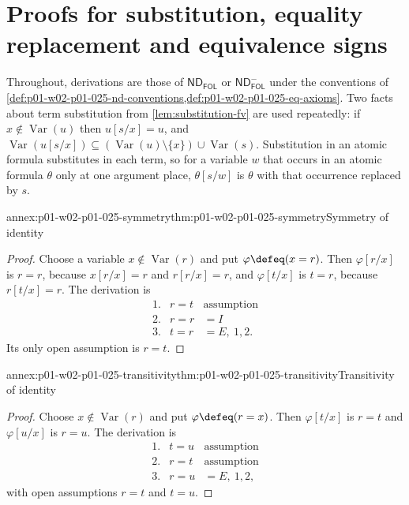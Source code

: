 \section{Proofs for substitution, equality replacement and equivalence signs}
\label{sec:annex-p01-w02-p01-025-equality}

Throughout, derivations are those of \(\mathsf{ND}_{\mathsf{FOL}}\) or
\(\mathsf{ND}^{-}_{\mathsf{FOL}}\) under the conventions of
\cref{def:p01-w02-p01-025-nd-conventions,def:p01-w02-p01-025-eq-axioms}.
Two facts about term substitution from \cref{lem:substitution-fv} are used
repeatedly: if \(x\notin\operatorname{Var}(u)\) then \(u[s/x]=u\), and
\(\operatorname{Var}(u[s/x])\subseteq(\operatorname{Var}(u)\setminus\{x\})
\cup\operatorname{Var}(s)\).  Substitution in an atomic formula substitutes
in each term, so for a variable \(w\) that occurs in an atomic formula
\(\theta\) only at one argument place, \(\theta[s/w]\) is \(\theta\) with
that occurrence replaced by \(s\).

\begin{annexitem}{annex:p01-w02-p01-025-symmetry}{thm:p01-w02-p01-025-symmetry}{Symmetry of identity}
\begin{proof}
Choose a variable \(x\notin\operatorname{Var}(r)\) and put
\(\varphi\defeq(x=r)\).  Then \(\varphi[r/x]\) is \(r=r\), because
\(x[r/x]=r\) and \(r[r/x]=r\), and \(\varphi[t/x]\) is \(t=r\), because
\(r[t/x]=r\).  The derivation is
\[
\begin{array}{rll}
1.&r=t&\text{assumption}\\
2.&r=r&=I\\
3.&t=r&=E,\ 1,2.
\end{array}
\]
Its only open assumption is \(r=t\).
\end{proof}
\end{annexitem}

\begin{annexitem}{annex:p01-w02-p01-025-transitivity}{thm:p01-w02-p01-025-transitivity}{Transitivity of identity}
\begin{proof}
Choose \(x\notin\operatorname{Var}(r)\) and put \(\varphi\defeq(r=x)\).
Then \(\varphi[t/x]\) is \(r=t\) and \(\varphi[u/x]\) is \(r=u\).  The
derivation is
\[
\begin{array}{rll}
1.&t=u&\text{assumption}\\
2.&r=t&\text{assumption}\\
3.&r=u&=E,\ 1,2,
\end{array}
\]
with open assumptions \(r=t\) and \(t=u\).
\end{proof}
\end{annexitem}

